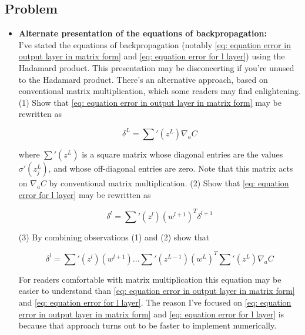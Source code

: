 \subsection*{Problem}
\label{subs: Problem alternate representation of backprop eqn}

\begin{itemize}
\item \textbf{Alternate presentation of the equations of backpropagation:}\\
I've stated the equations of backpropagation (notably \ref{eq: equation error in output layer in matrix form} and \ref{eq: equation error for l layer}) using the Hadamard product. This presentation may be disconcerting if you're unused to the Hadamard product. There's an alternative approach, based on conventional matrix multiplication, which some readers may find enlightening. (1) Show that \ref{eq: equation error in output layer in matrix form} may be rewritten as

\begin{equation}
\delta^L=\sum\nolimits'(z^L)\nabla_a C
\label{eq: equation of problem of alternate version bp1}
\end{equation}

where $\sum'(z^L)$ is a square matrix whose diagonal entries are the values $\sigma'(z^L_j)$, and whose off-diagonal entries are zero. Note that this matrix acts on $\nabla_a C$ by conventional matrix multiplication. (2) Show that \ref{eq: equation error for l layer} may be rewritten as

\begin{equation}
\delta^l=\sum\nolimits'(z^l)\left(w^{l+1}\right)^T\delta^{l+1}
\label{eq: equation of problem of alternate version bp2}
\end{equation}

(3) By combining observations (1) and (2) show that

\begin{equation}
\delta^l=\sum\nolimits'(z^l)\left(w^{l+1}\right)\ldots\sum\nolimits'(z^{L-1})\left(w^{L}\right)^T\sum\nolimits'(z^L)\nabla_a C
\label{eq: equation of problem combine 1 and 2}
\end{equation}

For readers comfortable with matrix multiplication this equation may be easier to understand than \ref{eq: equation error in output layer in matrix form} and \ref{eq: equation error for l layer}. The reason I've focused on \ref{eq: equation error in output layer in matrix form} and \ref{eq: equation error for l layer} is because that approach turns out to be faster to implement numerically.
\end{itemize}

